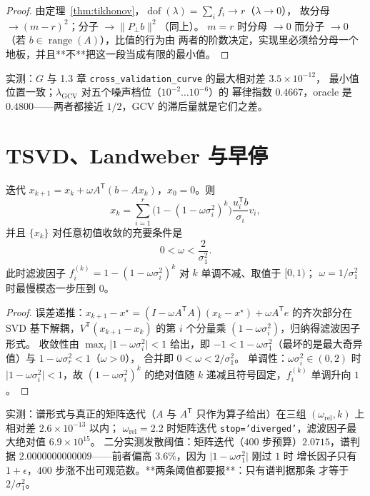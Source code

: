 \begin{proof}
由定理~\ref{thm:tikhonov}，$\operatorname{dof}(\lambda)=\sum_if_i\to r$（$\lambda\to0$），
故分母 $\to(m-r)^2$；分子 $\to\lVert P_\perp b\rVert^2$（同上）。
$m=r$ 时分母 $\to0$ 而分子 $\to0$（若 $b\in\operatorname{range}(A)$），比值的行为由
两者的阶数决定，实现里必须给分母一个地板，并且**不**把这一段当成有限的最小值。
\end{proof}

实测：$G$ 与 1.3 章 \texttt{cross\_validation\_curve} 的最大相对差 $3.5\times10^{-12}$，
最小值位置一致；$\lambda_{\mathrm{GCV}}$ 对五个噪声档位（$10^{-2}\dots10^{-6}$）的
幂律指数 $0.4667$，oracle 是 $0.4800$——两者都接近 $1/2$，GCV 的滞后量就是它们之差。

\section{TSVD、Landweber 与早停}

\begin{theorem}
\label{thm:landweber}
迭代 $x_{k+1}=x_k+\omega A^{\mathsf T}(b-Ax_k)$，$x_0=0$。则
\[
  x_k=\sum_{i=1}^{r}\bigl(1-(1-\omega\sigma_i^2)^k\bigr)\frac{u_i^{\mathsf T}b}{\sigma_i}v_i ,
\]
并且 $\{x_k\}$ 对任意初值收敛的充要条件是
\[
  0<\omega<\frac{2}{\sigma_1^2}.
\]
此时滤波因子 $f_i^{(k)}=1-(1-\omega\sigma_i^2)^k$ 对 $k$ 单调不减、取值于 $[0,1)$；
$\omega=1/\sigma_1^2$ 时最慢模态一步压到 $0$。
\end{theorem}

\begin{proof}
误差递推：$x_{k+1}-x^\star=(I-\omega A^{\mathsf T}A)(x_k-x^\star)+\omega A^{\mathsf T}e$
的齐次部分在 SVD 基下解耦，$V^{\mathsf T}(x_{k+1}-x_k)$ 的第 $i$ 个分量乘
$(1-\omega\sigma_i^2)$，归纳得滤波因子形式。
收敛性由 $\max_i\lvert1-\omega\sigma_i^2\rvert<1$ 给出，即
$-1<1-\omega\sigma_1^2$（最坏的是最大奇异值）与 $1-\omega\sigma_r^2<1$（$\omega>0$），
合并即 $0<\omega<2/\sigma_1^2$。
单调性：$\omega\sigma_i^2\in(0,2)$ 时 $\lvert1-\omega\sigma_i^2\rvert<1$，故
$(1-\omega\sigma_i^2)^k$ 的绝对值随 $k$ 递减且符号固定，$f_i^{(k)}$ 单调升向 $1$。
\end{proof}

实测：谱形式与真正的矩阵迭代（$A$ 与 $A^{\mathsf T}$ 只作为算子给出）在三组
$(\omega_{\text{rel}},k)$ 上相对差 $2.6\times10^{-13}$ 以内；
$\omega_{\text{rel}}=2.2$ 时矩阵迭代 \texttt{stop='diverged'}，滤波因子最大绝对值 $6.9\times10^{15}$。
二分实测发散阈值：矩阵迭代（$400$ 步预算）$2.0715$，谱判据
$2.0000000000009$——前者偏高 $3.6\%$，因为 $\lvert1-\omega\sigma_1^2\rvert$ 刚过 $1$ 时
增长因子只有 $1+\epsilon$，$400$ 步涨不出可观范数。**两条阈值都要报**：只有谱判据那条
才等于 $2/\sigma_1^2$。

